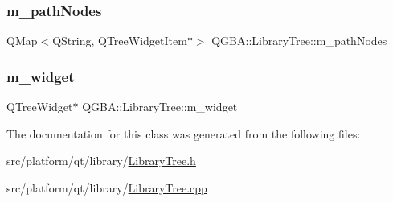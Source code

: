 \mbox{\label{class_q_g_b_a_1_1_library_tree_a59d386067d287bef2a4543af33709d48}} 
\subsubsection{\texorpdfstring{m\+\_\+path\+Nodes}{m\_pathNodes}}
{\footnotesize\ttfamily Q\+Map$<$Q\+String, Q\+Tree\+Widget\+Item$\ast$$>$ Q\+G\+B\+A\+::\+Library\+Tree\+::m\+\_\+path\+Nodes\hspace{0.3cm}{\ttfamily [private]}}

\mbox{\label{class_q_g_b_a_1_1_library_tree_a507840b24ad3d110bb44bb8ccbc4fdf3}} 
\subsubsection{\texorpdfstring{m\+\_\+widget}{m\_widget}}
{\footnotesize\ttfamily Q\+Tree\+Widget$\ast$ Q\+G\+B\+A\+::\+Library\+Tree\+::m\+\_\+widget\hspace{0.3cm}{\ttfamily [private]}}



The documentation for this class was generated from the following files\+:\begin{DoxyCompactItemize}
\item 
src/platform/qt/library/\mbox{\hyperlink{_library_tree_8h}{Library\+Tree.\+h}}\item 
src/platform/qt/library/\mbox{\hyperlink{_library_tree_8cpp}{Library\+Tree.\+cpp}}\end{DoxyCompactItemize}
